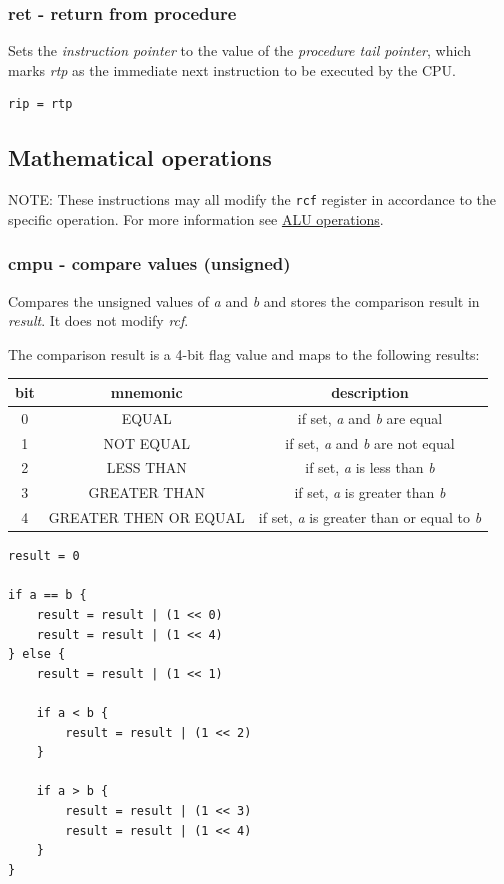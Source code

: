 \documentclass[a4paper,10pt]{article}
\begin{document}
\subsubsection{ret - return from procedure}
	{Sets the \emph{instruction pointer} to the value of the \emph{procedure tail pointer}, which marks \emph{rtp} as the immediate next instruction to be executed by the CPU.}
\begin{lstlisting}
rip = rtp
\end{lstlisting}

\subsection{Mathematical operations}
NOTE: These instructions may all modify the \verb|rcf| register in accordance to the specific operation. For more information see \hyperref[CPU-alu:op]{ALU operations}.

\subsubsection{cmpu - compare values (unsigned)}
	{
		Compares the unsigned values of \emph{a} and \emph{b} and stores the comparison result in \emph{result}. It does not modify \emph{rcf}.

		The comparison result is a 4-bit flag value and maps to the following results:
		\begin{table}[H]
			\centering
			\begin{tabular}{|c|c|c|}
				\hline
				bit & mnemonic & description \\
				\hline
				0 & EQUAL & if set, \emph{a} and \emph{b} are equal \\
				\hline
				1 & NOT EQUAL & if set, \emph{a} and \emph{b} are not equal \\
				\hline
				2 & LESS THAN & if set, \emph{a} is less than \emph{b} \\
				\hline
				3 & GREATER THAN & if set, \emph{a} is greater than \emph{b} \\
				\hline
				4 & GREATER THEN OR EQUAL & if set, \emph{a} is greater than or equal to \emph{b} \\
				\hline
			\end{tabular}
		\end{table}
	}
\begin{lstlisting}
result = 0

if a == b {
	result = result | (1 << 0)
	result = result | (1 << 4)
} else {
	result = result | (1 << 1)

	if a < b {
		result = result | (1 << 2)
	}

	if a > b {
		result = result | (1 << 3)
		result = result | (1 << 4)
	}
}
\end{lstlisting}
\end{document}
